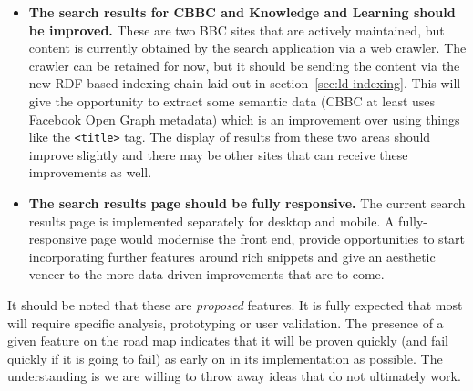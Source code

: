 \begin{itemize}
\item \textbf{The search results for CBBC and Knowledge and Learning should be improved.}
  These are two BBC sites that are actively maintained, but content is currently obtained by
  the search application via a web crawler. The crawler can be retained for now, but it should
  be sending the content via the new RDF-based indexing chain laid out in section~\ref{sec:ld-indexing}.
  This will give the opportunity to extract some semantic data (CBBC at least uses Facebook
  Open Graph metadata) which is an improvement over using things like the \texttt{<title>} tag. The
  display of results from these two areas should improve slightly and there may be other sites
  that can receive these improvements as well.

\item \textbf{The search results page should be fully responsive.} The current search results page
  is implemented separately for desktop and mobile. A fully-responsive page would modernise
  the front end, provide opportunities to start incorporating further features around rich snippets
  and give an aesthetic veneer to the more data-driven improvements that are to come.

\end{itemize}

It should be noted that these are \emph{proposed} features. It is fully expected that
most will require specific analysis, prototyping or user validation. The presence of a given
feature on the road map indicates that it will be proven quickly (and fail quickly if it is going to fail)
as early on in its implementation as possible. The understanding is we are willing
to throw away ideas that do not ultimately work.
